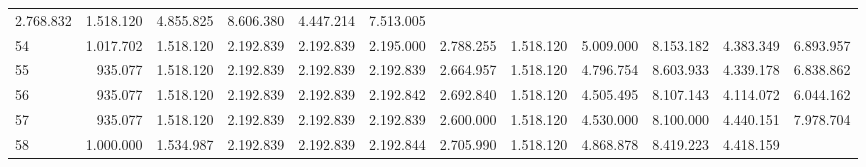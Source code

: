 \begin{tabular}{llllllllllll}
  \multicolumn{1}{r}{2.768.832} &
  \multicolumn{1}{r}{1.518.120} &
  \multicolumn{1}{r}{4.855.825} &
  \multicolumn{1}{r}{8.606.380} &
  \multicolumn{1}{r}{4.447.214} &
  \multicolumn{1}{r}{7.513.005} \\
\multicolumn{1}{l}{\hspace{1em}54} &
  \multicolumn{1}{|r}{1.017.702} &
  \multicolumn{1}{r}{1.518.120} &
  \multicolumn{1}{r}{2.192.839} &
  \multicolumn{1}{r}{2.192.839} &
  \multicolumn{1}{r}{2.195.000} &
  \multicolumn{1}{r}{2.788.255} &
  \multicolumn{1}{r}{1.518.120} &
  \multicolumn{1}{r}{5.009.000} &
  \multicolumn{1}{r}{8.153.182} &
  \multicolumn{1}{r}{4.383.349} &
  \multicolumn{1}{r}{6.893.957} \\
\multicolumn{1}{l}{\hspace{1em}55} &
  \multicolumn{1}{|r}{935.077} &
  \multicolumn{1}{r}{1.518.120} &
  \multicolumn{1}{r}{2.192.839} &
  \multicolumn{1}{r}{2.192.839} &
  \multicolumn{1}{r}{2.192.839} &
  \multicolumn{1}{r}{2.664.957} &
  \multicolumn{1}{r}{1.518.120} &
  \multicolumn{1}{r}{4.796.754} &
  \multicolumn{1}{r}{8.603.933} &
  \multicolumn{1}{r}{4.339.178} &
  \multicolumn{1}{r}{6.838.862} \\
\multicolumn{1}{l}{\hspace{1em}56} &
  \multicolumn{1}{|r}{935.077} &
  \multicolumn{1}{r}{1.518.120} &
  \multicolumn{1}{r}{2.192.839} &
  \multicolumn{1}{r}{2.192.839} &
  \multicolumn{1}{r}{2.192.842} &
  \multicolumn{1}{r}{2.692.840} &
  \multicolumn{1}{r}{1.518.120} &
  \multicolumn{1}{r}{4.505.495} &
  \multicolumn{1}{r}{8.107.143} &
  \multicolumn{1}{r}{4.114.072} &
  \multicolumn{1}{r}{6.044.162} \\
\multicolumn{1}{l}{\hspace{1em}57} &
  \multicolumn{1}{|r}{935.077} &
  \multicolumn{1}{r}{1.518.120} &
  \multicolumn{1}{r}{2.192.839} &
  \multicolumn{1}{r}{2.192.839} &
  \multicolumn{1}{r}{2.192.839} &
  \multicolumn{1}{r}{2.600.000} &
  \multicolumn{1}{r}{1.518.120} &
  \multicolumn{1}{r}{4.530.000} &
  \multicolumn{1}{r}{8.100.000} &
  \multicolumn{1}{r}{4.440.151} &
  \multicolumn{1}{r}{7.978.704} \\
\multicolumn{1}{l}{\hspace{1em}58} &
  \multicolumn{1}{|r}{1.000.000} &
  \multicolumn{1}{r}{1.534.987} &
  \multicolumn{1}{r}{2.192.839} &
  \multicolumn{1}{r}{2.192.839} &
  \multicolumn{1}{r}{2.192.844} &
  \multicolumn{1}{r}{2.705.990} &
  \multicolumn{1}{r}{1.518.120} &
  \multicolumn{1}{r}{4.868.878} &
  \multicolumn{1}{r}{8.419.223} &
  \multicolumn{1}{r}{4.418.159} &

\end{tabular}

